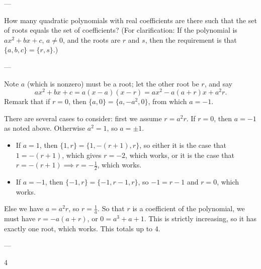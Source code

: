 
---

How many quadratic polynomials with real coefficients are there such that the set of roots equals the set of coefficients? (For clarification: If the polynomial is $ax^2+bx+c$, $a\ne0$, and the roots are $r$ and $s$, then the requirement is that $\{a,b,c\}=\{r,s\}$.)

---

Note $a$ (which is nonzero) must be a root; let the other root be $r$, and say \[ax^2+bx+c=a(x-a)(x-r)=ax^2-a(a+r)x+a^2r.\]
Remark that if $r=0$, then $\{a,0\}=\{a,-a^2,0\}$, from which $a=-1$.

There are several cases to consider: first we assume $r=a^2r$. If $r=0$, then $a=-1$ as noted above. Otherwise $a^2=1$, so $a=\pm1$.
\begin{itemize}
    \item If $a=1$, then $\{1,r\}=\{1,-(r+1),r\}$, so either it is the case that $1=-(r+1)$, which gives $r=-2$, which works, or it is the case that $r=-(r+1)\implies r=-\tfrac12$, which works.
    \item If $a=-1$, then $\{-1,r\}=\{-1,r-1,r\}$, so $-1=r-1$ and $r=0$, which works.
\end{itemize}
Else we have $a=a^2r$, so $r=\tfrac1a$. So that $r$ is a coefficient of the polynomial, we must have $r=-a(a+r)$, or $0=a^3+a+1$. This is strictly increasing, so it has exactly one root, which works. This totals up to $4$.

---

4
